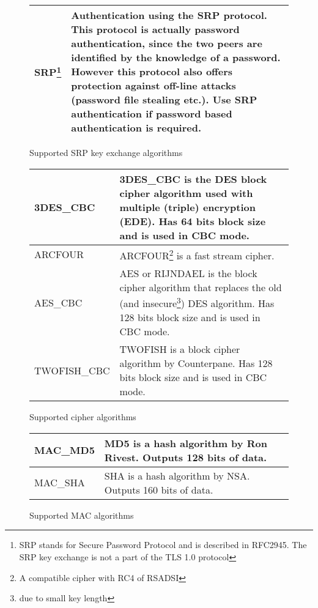\begin{figure}[hbtp]
\begin{tabular}{|l|p{9cm}|}

\hline
SRP\footnote{SRP stands for Secure Password Protocol and is described in
RFC2945. The SRP key exchange is not a part of the TLS 1.0 protocol} & Authentication using the SRP
protocol. This protocol is actually password authentication, since the two
peers are identified by the knowledge of a password. However this protocol
also offers protection against off-line attacks (password file stealing
etc.). Use SRP authentication if password based authentication is required.
\\
\hline
\end{tabular}

\caption{Supported SRP key exchange algorithms}

\end{figure}




\addvspace{1.5cm}

\begin{figure}[hbtp]
\begin{tabular}{|l|p{9cm}|}

\hline
3DES\_CBC & 3DES\_CBC is the DES block cipher algorithm used with multiple (triple)
encryption (EDE). Has 64 bits block size and is used in CBC mode.
\\
\hline
ARCFOUR & ARCFOUR\footnote{A compatible cipher with RC4 of RSADSI} is a
fast stream cipher.
\\
\hline
AES\_CBC & AES or RIJNDAEL is the block cipher algorithm that replaces the old 
(and insecure\footnote{due to small key length}) DES algorithm. Has
128 bits block size and is used in CBC mode.
\\
\hline
TWOFISH\_CBC & TWOFISH is a block cipher algorithm by Counterpane. Has
128 bits block size and is used in CBC mode.
\\
\hline
\end{tabular}
\caption{Supported cipher algorithms}

\end{figure}



\addvspace{1.5cm}

\begin{figure}[hbtp]
\begin{tabular}{|l|p{9cm}|}

\hline
MAC\_MD5 & MD5 is a hash algorithm by Ron Rivest. Outputs 128 bits of data.
\\
\hline
MAC\_SHA & SHA is a hash algorithm by NSA. Outputs 160 bits of data.
\\
\hline
\end{tabular}
\caption{Supported MAC algorithms}

\end{figure}

